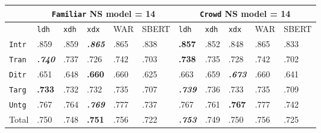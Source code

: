 \documentclass[handout,xcolor={dvipsnames}]{beamer}
\newcommand{\feat}[1]{\textsc{#1}}
\newcommand{\param}[1]{\texttt{#1}}
\begin{document}
\begin{frame}
\small
\begin{table}[htb!]
\begin{center}
\setlength{\tabcolsep}{.35em}
\begin{tabular}{|l||l|l|l||l|l||l|l|l||l|l|}
\hline
 & \multicolumn{5}{c||}{\param{Fam\-il\-iar} NS model = 14} & \multicolumn{5}{c|}{\param{Crowd} NS model = 14} \\
\hline
    		& \param{ldh}	& \param{xdh} &	\param{xdx} & WAR	& {\scriptsize SBERT} & \param{ldh}	& \param{xdh} &	\param{xdx} & WAR	& {\scriptsize SBERT} \\ \hline
\hline
\param{Intr}  & .859                   & .859 & \textit{\textbf{.865}} & .865 & .838 & \textbf{.857}          & .852 & .848                   & .865 & .833 \\ \hline
\param{Tran}  & \textit{\textbf{.740}} & .737 & .726                   & .742 & .703 & \textbf{.738}          & .735 & .728                   & .742 & .702 \\ \hline
\param{Ditr}  & .651                   & .648 & \textbf{.660}          & .660 & .625 & .663                   & .659 & \textit{\textbf{.673}} &  .660 & .641 \\ \hline
\hline
\param{Targ}  & \textbf{.733}          & .732 & .732                   & .735 & .707 & \textit{\textbf{.739}} & .736 & .733                   & .735 & .709 \\ \hline
\param{Untg}  & .767                   & .764 & \textit{\textbf{.769}} & .777 & .737 & .767          & .761 & \textbf{.767}          & .777 & .742 \\ \hline
\hline
Total & .750                   & .748 & \textbf{.751}          & .756 & .722 & \textit{\textbf{.753}} & .749 & .750                   & .756 & .725 \\ \hline
\end{tabular}


\end{center}
\end{table}
\end{frame}
\end{document}
